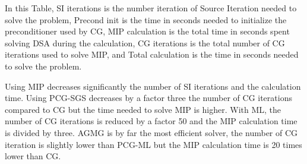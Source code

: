In this Table, SI iterations is the number iteration of Source Iteration
needed to solve the problem, Precond init is the time in seconds needed to
initialize the preconditioner used by CG, MIP calculation is the total time in
seconds spent solving DSA during the calculation, CG iterations is the total number 
of CG iterations used to solve MIP, and Total calculation is the time in
seconds needed to solve the problem.

Using MIP decreases significantly the number of SI iterations and the
calculation time. Using PCG-SGS decreases by a factor three the number of
CG iterations compared to CG but the time needed to solve MIP is higher. With
ML, the number of CG iterations is reduced by a factor 50 and the MIP
calculation time is divided by three. AGMG is by far the most efficient
solver, the number of CG iteration is slightly lower than PCG-ML but the MIP
calculation time is 20 times lower than CG.

